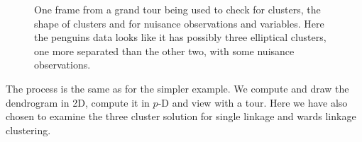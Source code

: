 \documentclass[
  letterpaper,
]{krantz}
\begin{document}
\begin{figure}


\caption{\label{fig-penguins-gt-pdf}One frame from a grand tour being
used to check for clusters, the shape of clusters and for nuisance
observations and variables. Here the penguins data looks like it has
possibly three elliptical clusters, one more separated than the other
two, with some nuisance observations.}

\end{figure}%

The process is the same as for the simpler example. We compute and draw
the dendrogram in 2D, compute it in \(p\)-D and view with a tour. Here
we have also chosen to examine the three cluster solution for single
linkage and wards linkage clustering.
\end{document}
